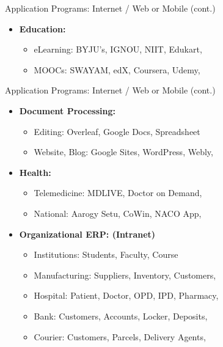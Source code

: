 \documentclass[aspectratio=169, xcolor=dvipsnames]{beamer}
\begin{document}
\begin{frame}{Application Programs: Internet / Web or Mobile (cont.)}
\begin{itemize}[<+->]
\begin{itemize}
            \item[$\triangleright$] Digital Library: National Digital Library of India,
            \item[$\triangleright$] Archives: Internet Archive, arXiv, Nextpoint,
        \end{itemize}
        \item \textbf{Education:}
        \begin{itemize}
            \item[$\triangleright$] eLearning: BYJU's, IGNOU, NIIT, Edukart,
            \item[$\triangleright$] MOOCs: SWAYAM, edX, Coursera, Udemy,
        \end{itemize}
    \end{itemize}
\end{frame}

\begin{frame}{Application Programs: Internet / Web or Mobile (cont.)}
    \begin{itemize}[<+->]
        \item \textbf{Document Processing:}
        \begin{itemize}
            \item[$\triangleright$] Editing: Overleaf, Google Docs, Spreadsheet
            \item[$\triangleright$] Website, Blog: Google Sites, WordPress, Webly,
        \end{itemize}
        \item \textbf{Health:}
        \begin{itemize}
            \item[$\triangleright$] Telemedicine: MDLIVE, Doctor on Demand,
            \item[$\triangleright$] National: Aarogy Setu, CoWin, NACO App,
        \end{itemize}
        \item \textbf{Organizational ERP: (Intranet)}
        \begin{itemize}
            \item[$\triangleright$] Institutions: Students, Faculty, Course
            \item[$\triangleright$] Manufacturing: Suppliers, Inventory, Customers,
            \item[$\triangleright$] Hospital: Patient, Doctor, OPD, IPD, Pharmacy,
            \item[$\triangleright$] Bank: Customers, Accounts, Locker, Deposits,
            \item[$\triangleright$] Courier: Customers, Parcels, Delivery Agents,
        \end{itemize}
    \end{itemize}
\end{frame}
\end{document}
